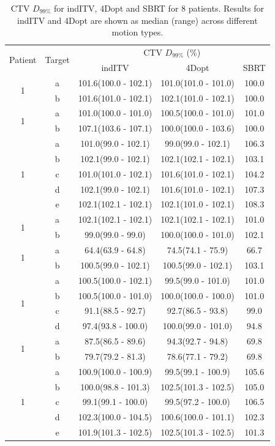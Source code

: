 \documentclass[type=dr, dr=rernat, accentcolor=tud7b,colorbacktitle, bigchapter, openright, twoside, 12pt ]{tudthesis}
\begin{document}
\begin{table}[H]
	\centering
	\caption{CTV $D_{99\%}$ for indITV, 4Dopt and SBRT for 8 patients. Results for indITV and 4Dopt are shown as median (range) across different motion types.}
	\begin{tabular}{c|c|c|c|c}
		\hline\hline
		\multirow{2}{*}{Patient} & \multirow{2}{*}{Target} & \multicolumn{3}{|c}{CTV $D_{99\%}$ (\%)}  \\
		 &  & indITV & 4Dopt & SBRT \\
		 \hline
		 
\multirow{2}{*}{1} & a & 101.6(100.0 - 102.1) & 101.0(101.0 - 101.0) & 100.0\\ 
 & b & 101.6(101.0 - 102.1) & 102.1(101.0 - 102.1) & 100.0\\ 
 \hline
\multirow{2}{*}{1} & a & 101.0(100.0 - 101.0) & 100.5(100.0 - 101.0) & 101.0\\ 
 & b & 107.1(103.6 - 107.1) & 100.0(100.0 - 103.6) & 100.0\\ 
 \hline
\multirow{5}{*}{1} & a & 101.0(99.0 - 102.1) & 99.0(99.0 - 102.1) & 106.3\\ 
 & b & 102.1(99.0 - 102.1) & 102.1(102.1 - 102.1) & 103.1\\ 
 & c & 101.0(101.0 - 102.1) & 101.6(101.0 - 102.1) & 104.2\\ 
 & d & 102.1(99.0 - 102.1) & 101.6(101.0 - 102.1) & 107.3\\ 
 & e & 102.1(102.1 - 102.1) & 102.1(101.0 - 102.1) & 108.3\\ 
 \hline
\multirow{2}{*}{1} & a & 102.1(102.1 - 102.1) & 102.1(102.1 - 102.1) & 101.0\\ 
 & b & 99.0(99.0 - 99.0) & 100.0(100.0 - 101.0) & 102.1\\ 
 \hline
\multirow{2}{*}{1} & a & 64.4(63.9 - 64.8) & 74.5(74.1 - 75.9) & 66.7\\ 
 & b & 100.5(99.0 - 102.1) & 100.5(99.0 - 102.1) & 103.1\\ 
 \hline
\multirow{4}{*}{1} & a & 100.5(100.0 - 102.1) & 99.5(99.0 - 101.0) & 101.0\\ 
 & b & 100.5(100.0 - 101.0) & 100.0(100.0 - 100.0) & 101.0\\ 
 & c & 91.1(88.5 - 92.7) & 92.7(86.5 - 93.8) & 99.0\\ 
 & d & 97.4(93.8 - 100.0) & 100.0(99.0 - 101.0) & 94.8\\ 
 \hline
\multirow{2}{*}{1} & a & 87.5(86.5 - 89.6) & 94.3(92.7 - 94.8) & 69.8\\ 
 & b & 79.7(79.2 - 81.3) & 78.6(77.1 - 79.2) & 69.8\\ 
 \hline
\multirow{5}{*}{1} & a & 100.9(100.0 - 100.9) & 99.5(99.1 - 100.9) & 105.6\\ 
 & b & 100.0(98.8 - 101.3) & 102.5(101.3 - 102.5) & 105.0\\ 
 & c & 99.1(99.1 - 100.0) & 99.5(97.2 - 100.0) & 106.5\\ 
 & d & 102.3(100.0 - 104.5) & 100.6(100.0 - 101.1) & 102.3\\ 
 & e & 101.9(101.3 - 102.5) & 102.5(101.3 - 102.5) & 101.3\\ 
\hline\hline
	\end{tabular}
	\label{tab:resultsComplex}
\end{table}
\end{document}
